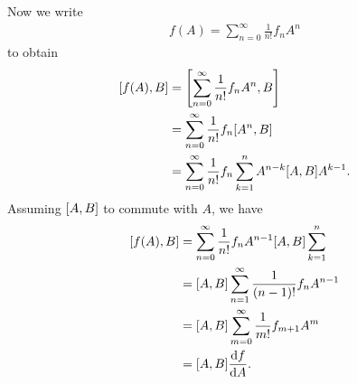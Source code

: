 Now we write
\begin{align*}
	f(A) = \sum\limits_{n = 0}^{\infty}\frac{1}{n!}f_{n}A^{n}
\end{align*}
to obtain
\begin{align*}
	\comm{f(A)}{B} &= \comm{\sum\limits_{n = 0}^{\infty}\frac{1}{n!}f_{n}A^{n}}{B} \\
	               &= \sum\limits_{n = 0}^{\infty}\frac{1}{n!}f_{n}\comm{A^{n}}{B} \\
	               &= \sum\limits_{n = 0}^{\infty}\frac{1}{n!}f_{n}\sum\limits_{k = 1}^{n}A^{n - k}\comm{A}{B}A^{k - 1}.
\end{align*}
Assuming $\comm{A}{B}$ to commute with $A$, we have
\begin{align*}
	\comm{f(A)}{B} &= \sum\limits_{n = 0}^{\infty}\frac{1}{n!}f_{n}A^{n - 1}\comm{A}{B}\sum\limits_{k = 1}^{n} \\
	               &= \comm{A}{B}\sum\limits_{n = 1}^{\infty}\frac{1}{(n - 1)!}f_{n}A^{n - 1} \\
	               &= \comm{A}{B}\sum\limits_{m = 0}^{\infty}\frac{1}{m!}f_{m + 1}A^{m} \\
	               &= \comm{A}{B}\dv{f}{A}.
\end{align*}